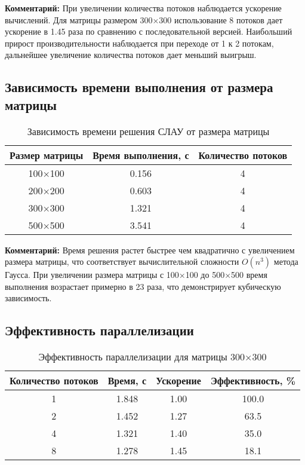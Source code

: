 \textbf{Комментарий:}
При увеличении количества потоков наблюдается ускорение вычислений. Для матрицы размером 300×300 использование 8 потоков дает ускорение в 1.45 раза по сравнению с последовательной версией. Наибольший прирост производительности наблюдается при переходе от 1 к 2 потокам, дальнейшее увеличение количества потоков дает меньший выигрыш.

\subsection{Зависимость времени выполнения от размера матрицы}

\begin{table}[h]
\centering
\begin{tabular}{|c|c|c|}
\hline
\textbf{Размер матрицы} & \textbf{Время выполнения, с} & \textbf{Количество потоков} \\
\hline
100×100 & 0.156 & 4 \\
200×200 & 0.603 & 4 \\
300×300 & 1.321 & 4 \\
500×500 & 3.541 & 4 \\
\hline
\end{tabular}
\caption{Зависимость времени решения СЛАУ от размера матрицы}
\label{tab:size}
\end{table}

\textbf{Комментарий:}
Время решения растет быстрее чем квадратично с увеличением размера матрицы, что соответствует вычислительной сложности $O(n^3)$ метода Гаусса. При увеличении размера матрицы с 100×100 до 500×500 время выполнения возрастает примерно в 23 раза, что демонстрирует кубическую зависимость.

\subsection{Эффективность параллелизации}

\begin{table}[h]
\centering
\begin{tabular}{|c|c|c|c|}
\hline
\textbf{Количество потоков} & \textbf{Время, с} & \textbf{Ускорение} & \textbf{Эффективность, \%} \\
\hline
1 & 1.848 & 1.00 & 100.0 \\
2 & 1.452 & 1.27 & 63.5 \\
4 & 1.321 & 1.40 & 35.0 \\
8 & 1.278 & 1.45 & 18.1 \\
\hline
\end{tabular}
\caption{Эффективность параллелизации для матрицы 300×300}
\label{tab:efficiency}
\end{table}

